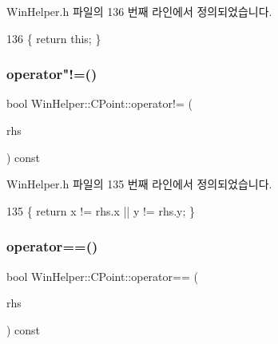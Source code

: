 Win\+Helper.\+h 파일의 136 번째 라인에서 정의되었습니다.


\begin{DoxyCode}
136 \{ \textcolor{keywordflow}{return} \textcolor{keyword}{this}; \}
\end{DoxyCode}
\mbox{\label{class_win_helper_1_1_c_point_a54c819ee7db3549434ac6e5cc8c6b103}} 
\subsubsection{\texorpdfstring{operator"!=()}{operator!=()}}
{\footnotesize\ttfamily bool Win\+Helper\+::\+C\+Point\+::operator!= (\begin{DoxyParamCaption}\item[{\mbox{\hyperlink{getopt1_8c_a2c212835823e3c54a8ab6d95c652660e}{const}} \mbox{\hyperlink{class_win_helper_1_1_c_point}{C\+Point}} \&}]{rhs }\end{DoxyParamCaption}) const\hspace{0.3cm}{\ttfamily [inline]}}



Win\+Helper.\+h 파일의 135 번째 라인에서 정의되었습니다.


\begin{DoxyCode}
135 \{ \textcolor{keywordflow}{return} x != rhs.x || y != rhs.y; \}
\end{DoxyCode}
\mbox{\label{class_win_helper_1_1_c_point_aad210b7d4619dad03142acdd689f4e46}} 
\subsubsection{\texorpdfstring{operator==()}{operator==()}}
{\footnotesize\ttfamily bool Win\+Helper\+::\+C\+Point\+::operator== (\begin{DoxyParamCaption}\item[{\mbox{\hyperlink{getopt1_8c_a2c212835823e3c54a8ab6d95c652660e}{const}} \mbox{\hyperlink{class_win_helper_1_1_c_point}{C\+Point}} \&}]{rhs }\end{DoxyParamCaption}) const\hspace{0.3cm}{\ttfamily [inline]}}



